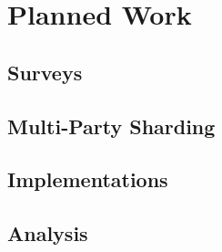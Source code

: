 \chapter{Planned Work}
\label{chap:planned}

\section{Surveys}
\section{Multi-Party Sharding}
\section{Implementations}
\section{Analysis}
